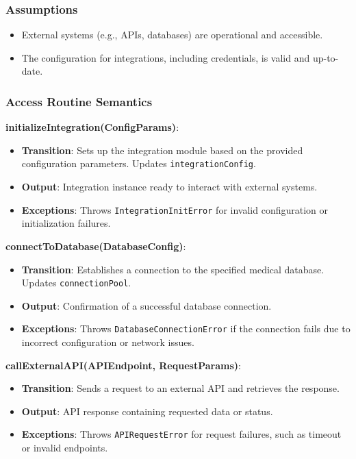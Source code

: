 \documentclass[12pt, titlepage]{article}
\begin{document}
\subsubsection{Assumptions}
\begin{itemize}
    \item External systems (e.g., APIs, databases) are operational and accessible.
    \item The configuration for integrations, including credentials, is valid and up-to-date.
\end{itemize}

\subsubsection{Access Routine Semantics}

\textbf{initializeIntegration(ConfigParams)}:
\begin{itemize}
    \item \textbf{Transition}: Sets up the integration module based on the provided configuration parameters. Updates \texttt{integrationConfig}.
    \item \textbf{Output}: Integration instance ready to interact with external systems.
    \item \textbf{Exceptions}: Throws \texttt{IntegrationInitError} for invalid configuration or initialization failures.
\end{itemize}

\textbf{connectToDatabase(DatabaseConfig)}:
\begin{itemize}
    \item \textbf{Transition}: Establishes a connection to the specified medical database. Updates \texttt{connectionPool}.
    \item \textbf{Output}: Confirmation of a successful database connection.
    \item \textbf{Exceptions}: Throws \texttt{DatabaseConnectionError} if the connection fails due to incorrect configuration or network issues.
\end{itemize}

\textbf{callExternalAPI(APIEndpoint, RequestParams)}:
\begin{itemize}
    \item \textbf{Transition}: Sends a request to an external API and retrieves the response.
    \item \textbf{Output}: API response containing requested data or status.
    \item \textbf{Exceptions}: Throws \texttt{APIRequestError} for request failures, such as timeout or invalid endpoints.
\end{itemize}
\end{document}
